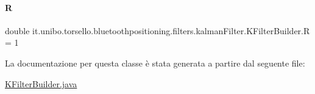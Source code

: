 \paragraph{\texorpdfstring{R}{R}}
{\footnotesize\ttfamily double it.\+unibo.\+torsello.\+bluetoothpositioning.\+filters.\+kalman\+Filter.\+K\+Filter\+Builder.\+R = 1\hspace{0.3cm}{\ttfamily [private]}}



La documentazione per questa classe è stata generata a partire dal seguente file\+:\begin{DoxyCompactItemize}
\item 
\hyperlink{KFilterBuilder_8java}{K\+Filter\+Builder.\+java}\end{DoxyCompactItemize}
